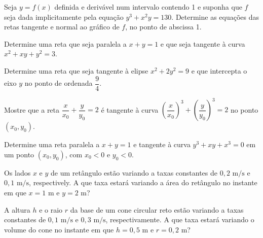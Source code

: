 \begin{exercicio}[4]
\label{ex:7.17.4}
Seja $y = f(x)$ definida e derivável num intervalo contendo 1 e suponha que $f$ seja dada implicitamente pela equação $y^3 + x^2 y = 130$. Determine as equações das retas tangente e normal ao gráfico de $f$, no ponto de abscissa 1.
\end{exercicio}

\begin{exercicio}[5]
\label{ex:7.17.5}
Determine uma reta que seja paralela a $x + y = 1$ e que seja tangente à curva $x^2 + xy + y^2 = 3$.
\end{exercicio}

\begin{exercicio}[6]
\label{ex:7.17.6}
Determine uma reta que seja tangente à elipse $x^2 + 2y^2 = 9$ e que intercepta o eixo $y$ no ponto de ordenada $\dfrac{9}{4}$.
\end{exercicio}

\begin{exercicio}[7]
\label{ex:7.17.7}
Mostre que a reta $\dfrac{x}{x_0} + \dfrac{y}{y_0} = 2$ é tangente à curva $\left(\dfrac{x}{x_0}\right)^{\!3} + \left(\dfrac{y}{y_0}\right)^{\!3} = 2$ no ponto $(x_0, y_0)$.
\end{exercicio}

\begin{exercicio}[8]
\label{ex:7.17.8}
Determine uma reta paralela a $x + y = 1$ e tangente à curva $y^3 + xy + x^3 = 0$ em um ponto $(x_0, y_0)$, com $x_0 < 0$ e $y_0 < 0$.
\end{exercicio}

\begin{exercicio}[9]
\label{ex:7.17.9}
Os lados $x$ e $y$ de um retângulo estão variando a taxas constantes de $0{,}2\text{ m/s}$ e $0{,}1\text{ m/s}$, respectively. A que taxa estará variando a área do retângulo no instante em que $x = 1\text{ m}$ e $y = 2\text{ m}$?
\end{exercicio}

\begin{exercicio}[10]
\label{ex:7.17.10}
A altura $h$ e o raio $r$ da base de um cone circular reto estão variando a taxas constantes de $0{,}1\text{ m/s}$ e $0{,}3\text{ m/s}$, respectivamente. A que taxa estará variando o volume do cone no instante em que $h = 0{,}5\text{ m}$ e $r = 0{,}2\text{ m}$?
\end{exercicio}

